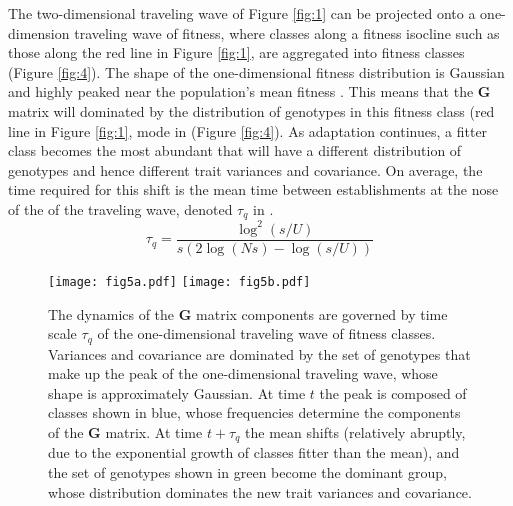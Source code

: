 \documentclass[9pt,twocolumn,twoside]{gsajnl}
\newcommand{\G}{\textbf{G }}
\begin{document}
The two-dimensional traveling wave of Figure \ref{fig:1} can be projected onto a one-dimension traveling wave of fitness, where classes along a fitness isocline such as those along the red line in Figure \ref{fig:1}, are aggregated into fitness classes (Figure \ref{fig:4}). The shape of the one-dimensional fitness distribution is Gaussian and highly peaked near the population's mean fitness \citep{desai2007beneficial}. This means that the \G matrix will dominated by the distribution of genotypes in this fitness class (red line in Figure \ref{fig:1}, mode in (Figure \ref{fig:4}). As adaptation continues, a fitter class becomes the most abundant that will have a different distribution of genotypes and hence different trait variances and covariance. On average, the time required for this shift is the mean time between establishments at the nose of the of the traveling wave, denoted $\tau_q$ in \citet{desai2007beneficial}.
\begin{equation}\label{eq:8}
\tau_q = \frac{\log^2(s/U)}{s(2\log(Ns)-\log(s/U))}
\end{equation}\par

\begin{figure}[!ht]
\texttt{[image: fig5a.pdf]}
\texttt{[image: fig5b.pdf]}
\caption{The dynamics of the \G matrix components are governed by time scale $\tau_q$ of the one-dimensional traveling wave of fitness classes. Variances and covariance are dominated by the set of genotypes that make up the peak of the one-dimensional traveling wave, whose shape is approximately Gaussian. At time $t$ the peak is composed of classes shown in blue, whose frequencies determine the components of the \G  matrix. At time $t+\tau_q$ the mean shifts (relatively abruptly, due to the exponential growth of classes fitter than the mean), and the set of genotypes shown in green become the dominant group, whose distribution dominates the new trait variances and covariance.}\label{fig:5}
% 
% 
\end{figure}
\end{document}
